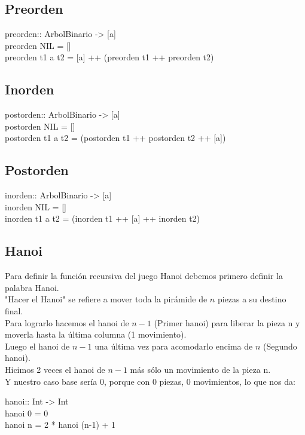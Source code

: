 \documentclass[11pt,letterpaper]{article}
\begin{document}
      \subsection{Preorden}
      \begin{ttfamily}
         preorden:: ArbolBinario -> [a] \\
         preorden NIL = [] \\
         preorden t1 a t2 = [a] ++ (preorden t1 ++ preorden t2)
      \end{ttfamily}

      \subsection{Inorden}
      \begin{ttfamily}
         postorden:: ArbolBinario -> [a]\\
         postorden NIL = [] \\
         postorden t1 a t2 = (postorden t1 ++ postorden t2 ++ [a])
      \end{ttfamily}

      \subsection{Postorden}
         \begin{ttfamily}
            inorden:: ArbolBinario -> [a] \\
            inorden NIL = [] \\
            inorden t1 a t2 = (inorden t1 ++ [a] ++ inorden t2)
         \end{ttfamily}

      \subsection{Hanoi}
      Para definir la función recursiva del juego Hanoi debemos primero definir la palabra Hanoi.\\
      "Hacer el Hanoi" se refiere a mover toda la pirámide de $n$ piezas a su destino final.\\
      Para lograrlo hacemos el hanoi de $n - 1$ (Primer hanoi) para liberar la pieza n y moverla hasta la última columna (1 movimiento). \\
      Luego el hanoi de $n-1$ una última vez para acomodarlo encima de $n$ (Segundo hanoi).\\
      Hicimos 2 veces el hanoi de $n - 1$ más sólo un movimiento de la pieza n.\\
      Y nuestro caso base sería 0, porque con 0 piezas, 0 movimientos, lo que nos da:\\
         \begin{ttfamily}
            hanoi:: Int -> Int \\
            hanoi 0 = 0 \\
            hanoi n = 2 * hanoi (n-1) + 1
         \end{ttfamily}
\end{document}
